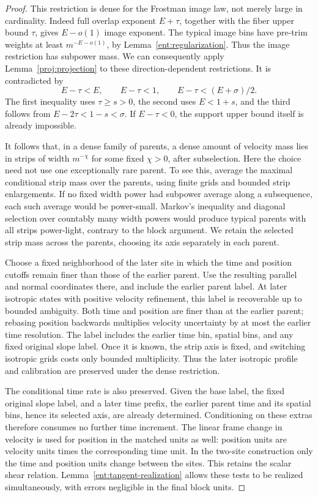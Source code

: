\begin{proof}
This restriction is dense for the Frostman image law, not merely large in
cardinality. Indeed full overlap exponent \(E+\tau\), together with the
fiber upper bound \(\tau\), gives \(E-o(1)\) image exponent. The typical
image bins have pre-trim weights at least \(m^{-E-o(1)}\), by
Lemma~\ref{ent:regularization}. Thus the image restriction has subpower
mass. We can consequently apply Lemma~\ref{proj:projection} to these
direction-dependent restrictions. It is contradicted by
\[
E-\tau<E,\qquad E-\tau<1,\qquad
E-\tau<(E+\sigma)/2.
\]
The first inequality uses \(\tau\ge s>0\), the second uses
\(E<1+s\), and the third follows from
\(E-2\tau<1-s<\sigma\). If \(E-\tau<0\), the support upper bound itself
is already impossible.

It follows that, in a dense family of parents, a dense amount of velocity
mass lies in strips of width \(m^{-\chi}\) for some fixed \(\chi>0\),
after subselection. Here the choice need not use one exceptionally rare
parent. To see this, average the maximal conditional strip mass over the
parents, using finite grids and bounded strip enlargements. If no fixed
width power had subpower average along a subsequence, each such average
would be power-small. Markov's inequality and diagonal selection over
countably many width powers would produce typical parents with all strips
power-light, contrary to the block argument. We retain the selected strip
mass across the parents, choosing its axis separately in each parent.

Choose a fixed neighborhood of the later site in which the time and
position cutoffs remain finer than those of the earlier parent. Use the
resulting parallel and normal coordinates there, and include the earlier
parent label. At later isotropic states
with positive velocity refinement, this label is recoverable up to bounded
ambiguity. Both time and position are finer than at the earlier parent;
rebasing position backwards multiplies velocity uncertainty by at most the
earlier time resolution. The label includes the earlier time bin, spatial
bins, and any fixed original slope label. Once it is known, the strip axis
is fixed, and switching isotropic grids costs only bounded multiplicity.
Thus the later isotropic profile and calibration are preserved under the
dense restriction.

The conditional time rate is also preserved. Given the base label, the
fixed original slope label, and a later time prefix, the earlier parent
time and its spatial bins, hence its selected axis, are already determined.
Conditioning on these extras therefore consumes no further time increment.
The linear frame change in velocity is used for position in the matched
units as well: position units are velocity units times the corresponding
time unit. In the two-site construction only the time and position units
change between the sites. This retains the scalar shear relation.
Lemma~\ref{ent:tangent-realization} allows these tests to be realized
simultaneously, with errors negligible in the final block units.


\end{proof}
